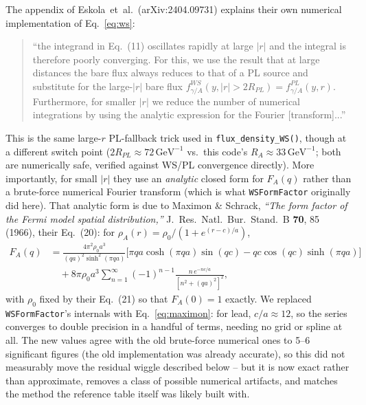 \documentclass[11pt]{article}
\begin{document}
The appendix of Eskola~et~al.\ (arXiv:2404.09731) explains their own
numerical implementation of Eq.~\eqref{eq:ws}:
\begin{quote}
``the integrand in Eq.~(11) oscillates rapidly at large $|r|$ and the
integral is therefore poorly converging. For this, we use the result that
at large distances the bare flux always reduces to that of a PL source and
substitute for the large-$|r|$ bare flux
$f_{\gamma/A}^{WS}(y,|r|>2R_{PL})=f_{\gamma/A}^{PL}(y,r)$.
Furthermore, for smaller $|r|$ we reduce the number of numerical
integrations by using the analytic expression for the Fourier
[transform]...''
\end{quote}
This is the same large-$r$ PL-fallback trick used in \texttt{flux\_density\_WS()},
though at a different switch point ($2R_{PL}\approx72\,\text{GeV}^{-1}$ vs.\
this code's $R_A\approx33\,\text{GeV}^{-1}$; both are numerically safe,
verified against WS/PL convergence directly). More importantly, for small
$|r|$ they use an \emph{analytic} closed form for $F_A(q)$ rather than a
brute-force numerical Fourier transform (which is what \texttt{WSFormFactor}
originally did here). That analytic form is due to Maximon \& Schrack,
\emph{``The form factor of the Fermi model spatial distribution,''} J.\ Res.\
Natl.\ Bur.\ Stand.\ B \textbf{70}, 85 (1966), their Eq.~(20): for
$\rho_A(r)=\rho_0/(1+e^{(r-c)/a})$,
\begin{align}
F_A(q) &= \frac{4\pi^2\rho_0 a^3}{(qa)^2\sinh^2(\pi qa)}
\Big[\pi qa\cosh(\pi qa)\sin(qc)-qc\cos(qc)\sinh(\pi qa)\Big] \nonumber\\
&\quad+8\pi\rho_0a^3\sum_{n=1}^\infty(-1)^{n-1}\frac{n\,e^{-nc/a}}{[n^2+(qa)^2]^2},
\label{eq:maximon}
\end{align}
with $\rho_0$ fixed by their Eq.~(21) so that $F_A(0)=1$ exactly. We
replaced \texttt{WSFormFactor}'s internals with Eq.~\eqref{eq:maximon}: for
lead, $c/a\approx12$, so the series converges to double precision in a
handful of terms, needing no grid or spline at all. The new values agree
with the old brute-force numerical ones to 5--6 significant figures (the
old implementation was already accurate), so this did not measurably move
the residual wiggle described below -- but it is now exact rather than
approximate, removes a class of possible numerical artifacts, and matches
the method the reference table itself was likely built with.
\end{document}
